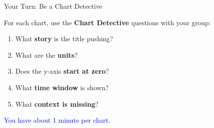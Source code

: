 \documentclass[9pt,english,aspectratio=169]{beamer}
\begin{document}
\begin{frame}{Your Turn: Be a Chart Detective}

  \vspace{0.5em}
  For each chart, use the \textbf{Chart Detective} questions with your group:

  \vspace{0.5em}
  \begin{enumerate}
    \item What \textbf{story} is the title pushing?
    \item What are the \textbf{units}?
    \item Does the y-axis \textbf{start at zero}?
    \item What \textbf{time window} is shown?
    \item What \textbf{context is missing}?
  \end{enumerate}

  \vspace{0.8em}
  \Large\textcolor{blue}{You have about 1 minute per chart.}

\end{frame}

\end{document}
